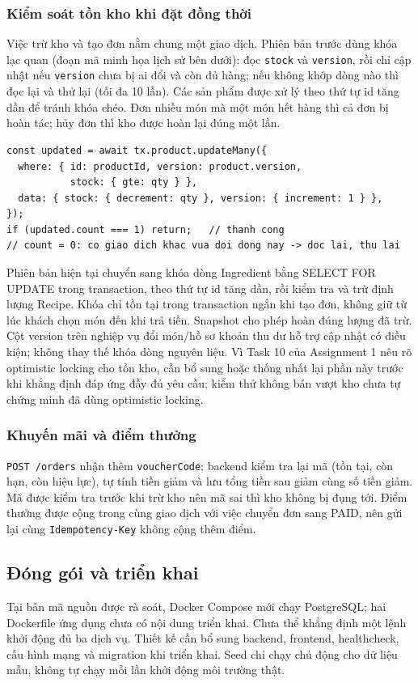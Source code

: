 \documentclass[a4paper]{article}
\begin{document}
\subsubsection{Kiểm soát tồn kho khi đặt đồng thời}
Việc trừ kho và tạo đơn nằm chung một giao dịch. Phiên bản trước dùng khóa lạc quan (đoạn mã minh họa lịch sử bên dưới): đọc \texttt{stock} và \texttt{version}, rồi chỉ cập nhật nếu \texttt{version} chưa bị ai đổi và còn đủ hàng; nếu không khớp dòng nào thì đọc lại và thử lại (tối đa 10 lần). Các sản phẩm được xử lý theo thứ tự id tăng dần để tránh khóa chéo. Đơn nhiều món mà một món hết hàng thì cả đơn bị hoàn tác; hủy đơn thì kho được hoàn lại đúng một lần.
\begin{lstlisting}[style=brew]
const updated = await tx.product.updateMany({
  where: { id: productId, version: product.version,
           stock: { gte: qty } },
  data: { stock: { decrement: qty }, version: { increment: 1 } },
});
if (updated.count === 1) return;   // thanh cong
// count = 0: co giao dich khac vua doi dong nay -> doc lai, thu lai
\end{lstlisting}

Phiên bản hiện tại chuyển sang khóa dòng Ingredient bằng SELECT FOR UPDATE trong transaction, theo thứ tự id tăng dần, rồi kiểm tra và trừ định lượng Recipe. Khóa chỉ tồn tại trong transaction ngắn khi tạo đơn, không giữ từ lúc khách chọn món đến khi trả tiền. Snapshot cho phép hoàn đúng lượng đã trừ. Cột version trên nghiệp vụ đổi món/hồ sơ khoản thu dư hỗ trợ cập nhật có điều kiện; không thay thế khóa dòng nguyên liệu. Vì Task 10 của Assignment 1 nêu rõ optimistic locking cho tồn kho, cần bổ sung hoặc thống nhất lại phần này trước khi khẳng định đáp ứng đầy đủ yêu cầu; kiểm thử không bán vượt kho chưa tự chứng minh đã dùng optimistic locking.

\subsubsection{Khuyến mãi và điểm thưởng}
\texttt{POST /orders} nhận thêm \texttt{voucherCode}; backend kiểm tra lại mã (tồn tại, còn hạn, còn hiệu lực), tự tính tiền giảm và lưu tổng tiền sau giảm cùng số tiền giảm. Mã được kiểm tra trước khi trừ kho nên mã sai thì kho không bị đụng tới. Điểm thưởng được cộng trong cùng giao dịch với việc chuyển đơn sang PAID, nên gửi lại cùng \texttt{Idempotency-Key} không cộng thêm điểm.

\subsection{Đóng gói và triển khai}
Tại bản mã nguồn được rà soát, Docker Compose mới chạy PostgreSQL; hai Dockerfile ứng dụng chưa có nội dung triển khai. Chưa thể khẳng định một lệnh khởi động đủ ba dịch vụ. Thiết kế cần bổ sung backend, frontend, healthcheck, cấu hình mạng và migration khi triển khai. Seed chỉ chạy chủ động cho dữ liệu mẫu, không tự chạy mỗi lần khởi động môi trường thật.
\end{document}
